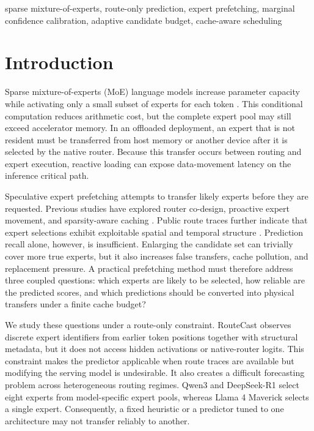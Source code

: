 \documentclass[conference]{IEEEtran}
\begin{document}
\begin{IEEEkeywords}
sparse mixture-of-experts, route-only prediction, expert prefetching,
marginal confidence calibration, adaptive candidate budget, cache-aware scheduling
\end{IEEEkeywords}

\section{Introduction}
Sparse mixture-of-experts (MoE) language models increase parameter capacity
while activating only a small subset of experts for each token
\cite{shazeer2017,gshard,switch}. This
conditional computation reduces arithmetic cost, but the complete expert pool
may still exceed accelerator memory. In an offloaded deployment, an expert
that is not resident must be transferred from host memory or another device
after it is selected by the native router. Because this transfer occurs
between routing and expert execution, reactive loading can expose
data-movement latency on the inference critical path.

Speculative expert prefetching attempts to transfer likely experts before they
are requested. Previous studies have explored router co-design, proactive
expert movement, and sparsity-aware caching
\cite{pregated,moeinfinity,promoe}. Public route traces further indicate that
expert selections exhibit exploitable spatial and temporal structure
\cite{patterns}. Prediction recall alone, however, is insufficient. Enlarging
the candidate set can trivially cover more true experts, but it also increases
false transfers, cache pollution, and replacement pressure. A practical
prefetching method must therefore address three coupled questions: which
experts are likely to be selected, how reliable are the predicted scores, and
which predictions should be converted into physical transfers under a finite
cache budget?

We study these questions under a route-only constraint. RouteCast observes
discrete expert identifiers from earlier token positions together with
structural metadata, but it does not access hidden activations or
native-router logits. This constraint makes the predictor applicable when
route traces are available but modifying the serving model is undesirable. It
also creates a difficult forecasting problem across heterogeneous routing
regimes. Qwen3 and DeepSeek-R1 select eight experts from model-specific expert
pools, whereas Llama 4 Maverick selects a single expert. Consequently, a fixed
heuristic or a predictor tuned to one architecture may not transfer reliably
to another.
\end{document}

